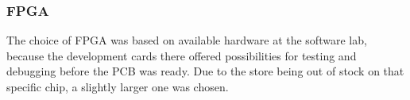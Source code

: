 
\subsubsection{FPGA}

The choice of FPGA was based on available hardware at the software lab, because the development cards
there offered possibilities for testing and debugging before the PCB was ready. Due to the store being out of stock on that specific chip, a slightly larger one was chosen. 
